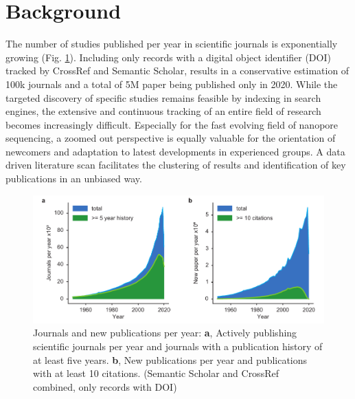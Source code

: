 \section{Background}
\label{sec:state_of_art:background}


The number of studies published per year in scientific journals is exponentially growing (Fig. \ref{fig:state_of_art:paper_count}).
Including only records with a digital object identifier (DOI) tracked by CrossRef and Semantic Scholar, results in a conservative estimation of 100k journals and a total of 5M paper being published only in 2020.
While the targeted discovery of specific studies remains feasible by indexing in search engines, the extensive and continuous tracking of an entire field of research becomes increasingly difficult.
Especially for the fast evolving field of nanopore sequencing, a zoomed out perspective is equally valuable for the orientation of newcomers and adaptation to latest developments in experienced groups.
A data driven literature scan facilitates the clustering of results and identification of key publications in an unbiased way.


\begin{figure}[h]
	\centering
	\includegraphics[width=1.0\textwidth]{figures/state_of_art/paper_count.pdf}
	\captionsetup{format=plain}
	\caption[Journals and publications per year]{Journals and new publications per year: \textbf{a}, Actively publishing scientific journals per year and journals with a publication history of at least five years. \textbf{b}, New publications per year and publications with at least 10 citations. (Semantic Scholar and CrossRef combined, only records with DOI)}
	\label{fig:state_of_art:paper_count}
\end{figure}

